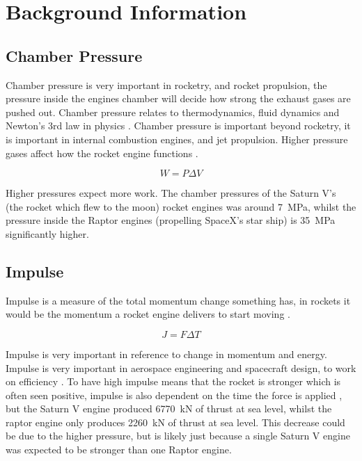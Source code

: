 \documentclass[12pt,a4paper]{article}
\begin{document}
\section{Background Information}

\subsection{Chamber Pressure}

Chamber pressure is very important in rocketry, and rocket propulsion, the pressure inside the engines chamber will decide how strong the exhaust gases are pushed out. Chamber pressure relates to thermodynamics, fluid dynamics and Newton's 3rd law in physics \cite{ref2}. Chamber pressure is important beyond rocketry, it is important in internal combustion engines, and jet propulsion. Higher pressure gases affect how the rocket engine functions \cite{ref1}. 

\begin{equation}
W = P\Delta V
\end{equation}

Higher pressures expect more work. The chamber pressures of the Saturn V's (the rocket which flew to the moon) rocket engines was around \SI{7}{\mega\pascal}, whilst the pressure inside the Raptor engines (propelling SpaceX's star ship) is \SI{35}{\mega\pascal} significantly higher.

\subsection{Impulse}

Impulse is a measure of the total momentum change something has, in rockets it would be the momentum a rocket engine delivers to start moving \cite{ref5}. 

\begin{equation}
J = F\Delta T
\end{equation}

Impulse is very important in reference to change in momentum and energy. Impulse is very important in aerospace engineering and spacecraft design, to work on efficiency \cite{ref3}. To have high impulse means that the rocket is stronger which is often seen positive, impulse is also dependent on the time the force is applied \cite{ref4}, but the Saturn V engine produced \SI{6770}{\kilo\newton} of thrust at sea level, whilst the raptor engine only produces \SI{2260}{\kilo\newton} of thrust at sea level. This decrease could be due to the higher pressure, but is likely just because a single Saturn V engine was expected to be stronger than one Raptor engine.
\end{document}
